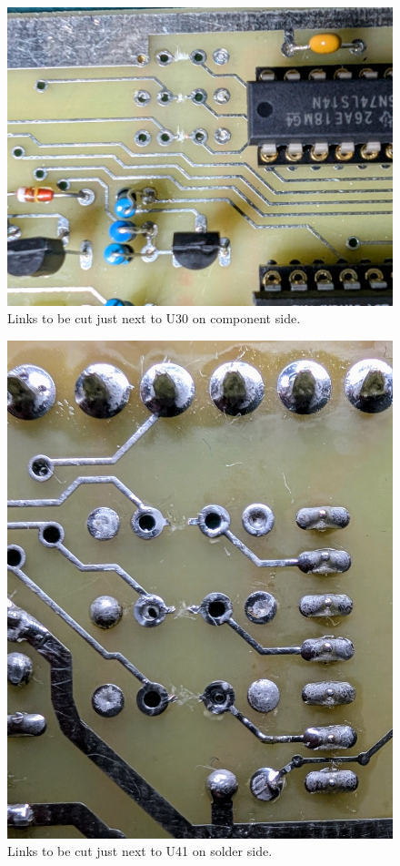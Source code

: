 \begin{figure}[htbp]
    \begin{center}
    \includegraphics[width=4.9in]{images/U30_links.jpg}
    \caption{Links to be cut just next to U30 on component side.}
    \label{fig:u30_links}
    \end{center}
    \end{figure}

\begin{figure}[htbp]
    \begin{center}
    \includegraphics[width=4.9in]{images/U41_links.jpg}
    \caption{Links to be cut just next to U41 on solder side.}
    \label{fig:u41_links}
    \end{center}
    \end{figure}

